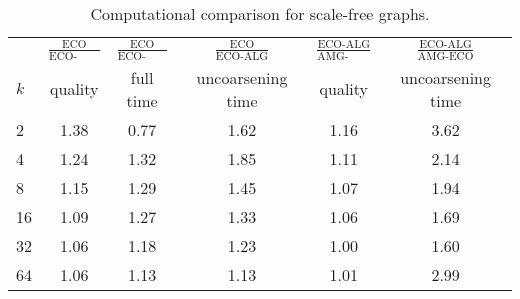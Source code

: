 \documentclass{llncs}
\begin{document}
\begin{table}[htbp]
\begin{center}
\vspace*{-.25cm}
\begin{tabular}{|l|c|c|c|c|c|}
\hline
 & $\frac{\text{ECO}}{\text{ECO-ALG}}$ & $\frac{\text{ECO}}{\text{ECO-ALG}}$ & $\frac{\text{ECO}}{\text{ECO-ALG}}$ & $\frac{\text{ECO-ALG}}{\text{AMG-ECO}}$ & $\frac{\text{ECO-ALG}}{\text{AMG-ECO}}$ \\ 
 $k$ & quality & full time & uncoarsening time & quality & uncoarsening time \\ \hline
2 & 1.38 & 0.77 & 1.62 & 1.16 & 3.62 \\ 
4 & 1.24 & 1.32 & 1.85 & 1.11 & 2.14 \\ 
8 & 1.15 & 1.29 & 1.45 & 1.07 & 1.94 \\ 
16 & 1.09 & 1.27 & 1.33 & 1.06 & 1.69 \\
32 & 1.06 & 1.18 & 1.23 & 1.00 & 1.60 \\
64 & 1.06 &	1.13 &	1.13 &	1.01 &	2.99 \\ \hline

\end{tabular}
\vspace*{.25cm}
\caption{Computational comparison for scale-free graphs.}\label{tab:social}
\vspace*{-1.5cm}
\end{center}
\end{table}
\end{document}
